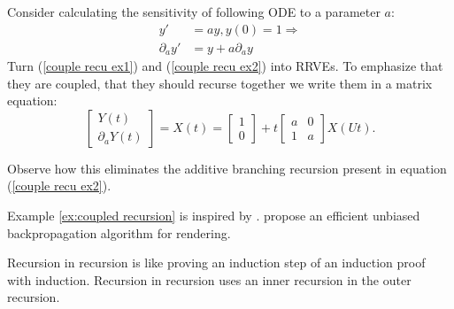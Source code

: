 \documentclass[a4paper,12pt]{article}
\begin{document}
\begin{example} \label{ex:coupled recursion}
    Consider calculating the
    sensitivity of following ODE to a
    parameter $a$:
    \begin{align}
        y'             & =ay,y(0)=1 \Rightarrow \label{couple recu ex1} \\
        \partial_{a}y' & = y + a \partial_{a}y \label{couple recu ex2}
    \end{align}
    Turn (\ref{couple recu ex1}) and (\ref{couple recu ex2}) into RRVEs.
    To emphasize that they are coupled, that they should
    recurse together we write them in a matrix equation:
    \begin{equation} \label{coupled mat}
        \begin{bmatrix}
            Y(t) \\
            \partial_{a}Y(t)
        \end{bmatrix}=
        X(t)=
        \begin{bmatrix}
            1 \\
            0
        \end{bmatrix}+
        t \begin{bmatrix}
            a & 0 \\
            1 & a
        \end{bmatrix}
        X(Ut).
    \end{equation}

    Observe how this eliminates the additive branching recursion
    present in equation (\ref{couple recu ex2}).

\end{example}

\begin{pythonn} 
\end{pythonn}

\begin{related}
    Example \ref{ex:coupled recursion} is inspired by \cite{vicini_path_2021}.
    \cite{vicini_path_2021} propose an efficient unbiased backpropagation
    algorithm for rendering.
\end{related}

\begin{technique}\label{tech:recu in recu}
    Recursion in recursion is like proving an induction
    step of an induction proof with induction. Recursion in recursion
    uses an inner recursion in the outer recursion.
\end{technique}
\end{document}
